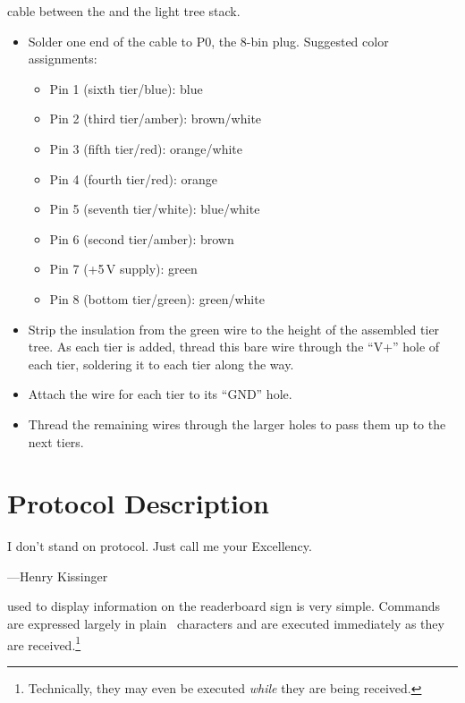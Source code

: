 \begin{enumerate}
		cable between the  and the light tree stack.
		\begin{itemize}
			\item Solder one end of the cable to P0, the 8-bin  plug. Suggested color assignments:
				\begin{itemize}
					\item Pin 1 (sixth tier/blue): blue	
					\item Pin 2 (third tier/amber): brown/white
					\item Pin 3 (fifth tier/red): orange/white
					\item Pin 4 (fourth tier/red): orange
					\item Pin 5 (seventh tier/white): blue/white
					\item Pin 6 (second tier/amber): brown
					\item Pin 7 (+5\,V supply): green
					\item Pin 8 (bottom tier/green): green/white
				\end{itemize}
			\item Strip the insulation from the green wire to the height of the assembled tier tree.
				As each tier is added, thread this bare wire through the ``V+'' hole of each tier, soldering it to
				each tier along the way.
			\item Attach the wire for each tier to its ``GND'' hole.
			\item Thread the remaining wires through the larger holes to pass them up to the next tiers.
		\end{itemize}
\end{enumerate}


                                                      
%
\chapter{Protocol Description}\label{chap:protocol}
{\setlength{\epigraphwidth}{.5\textwidth}
\epigraph{I don't stand on protocol. Just call me your Excellency.}{---Henry Kissinger}}
 used to display information on the readerboard sign is very simple.
Commands are expressed largely in plain \ascii\ characters and are executed immediately
as they are received.\footnote{Technically, they may even be executed \emph{while} they
are being received.}

